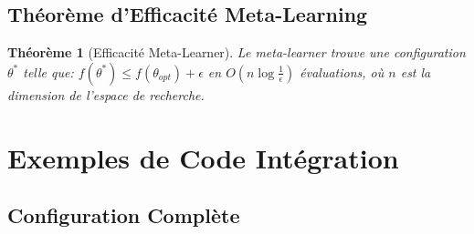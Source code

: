 \documentclass[12pt,a4paper]{article}
\newtheorem{theorem}{Théorème}
\begin{document}
\subsection{Théorème d'Efficacité Meta-Learning}

\begin{theorem}[Efficacité Meta-Learner]
Le meta-learner trouve une configuration $\theta^*$ telle que:
$f(\theta^*) \leq f(\theta_{opt}) + \epsilon$
en $O(n \log \frac{1}{\epsilon})$ évaluations, où $n$ est la dimension de l'espace de recherche.
\end{theorem}

\section{Exemples de Code Intégration}

\subsection{Configuration Complète}
\end{document}
